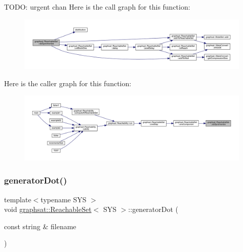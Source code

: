 T\+O\+DO\+: urgent chan Here is the call graph for this function\+:
\nopagebreak
\begin{figure}[H]
\begin{center}
\leavevmode
\includegraphics[width=350pt]{classgraphsat_1_1_reachable_set_a8ce33ab357efdf1308823c7c66a590b1_cgraph}
\end{center}
\end{figure}
Here is the caller graph for this function\+:
\nopagebreak
\begin{figure}[H]
\begin{center}
\leavevmode
\includegraphics[width=350pt]{classgraphsat_1_1_reachable_set_a8ce33ab357efdf1308823c7c66a590b1_icgraph}
\end{center}
\end{figure}
\mbox{\label{classgraphsat_1_1_reachable_set_a74be21480221cb48e2ce100ce712085b}} 
\subsubsection{\texorpdfstring{generatorDot()}{generatorDot()}}
{\footnotesize\ttfamily template$<$typename S\+YS $>$ \\
void \mbox{\hyperlink{classgraphsat_1_1_reachable_set}{graphsat\+::\+Reachable\+Set}}$<$ S\+YS $>$\+::generator\+Dot (\begin{DoxyParamCaption}\item[{const string \&}]{filename }\end{DoxyParamCaption})\hspace{0.3cm}{\ttfamily [inline]}}

